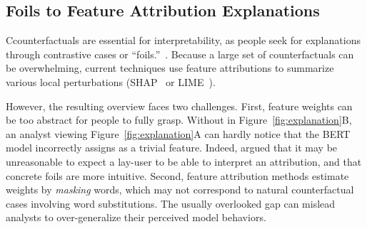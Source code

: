 \subsection{Foils to Feature Attribution Explanations}

Ccounterfactuals are essential for interpretability, as people seek for explanations through contrastive cases or ``foils.''~\cite{miller}.
Because a large set of counterfactuals can be overwhelming, current techniques use feature attributions to summarize various local perturbations (\eg SHAP~\cite{NIPS2017_7062} or LIME~\cite{Ribeiro2016WhySI}).

However, the resulting overview faces two challenges.
First, feature weights can be too abstract for people to fully grasp.
Without  in Figure~\ref{fig:explanation}B, an analyst viewing Figure~\ref{fig:explanation}A can hardly notice that the BERT \qqp model incorrectly assigns  as a trivial feature.
Indeed, \citet{miller} argued that it may be unreasonable to expect a lay-user to be able to interpret an attribution, and that concrete foils are more intuitive.
Second, feature attribution methods estimate weights by \emph{masking} words, which may not correspond to natural counterfactual cases involving \eg word substitutions.
The usually overlooked gap can mislead analysts to over-generalize their perceived model behaviors.


